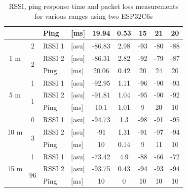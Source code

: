 \begin{table}[H]
\begin{tabular}{|c|c|l|l|c|c|c|c|c|}
        && Ping & [ms] & 19.94 & 0.53 & 15 & 21 & 20 \\\hline\hline
        \multirow{3}{*}{1 m} & \multirow{1}{*}{2} & RSSI 1 & [asu] & -86.83 & 2.98 & -93 & -80 & -88 \\\cline{2-9}\cline{2-9}
        & \multirow{2}{*}{2} & RSSI 2 & [asu] & -86.31 & 2.82 & -92 & -79 & -87 \\\cline{3-9}
        && Ping & [ms] & 20.06 & 0.42 & 20 & 24 & 20 \\\hline\hline
        \multirow{3}{*}{5 m} & \multirow{1}{*}{1} & RSSI 1 & [asu] & -92.95 & 1.11 & -96 & -90 & -93 \\\cline{2-9}\cline{2-9}
        & \multirow{2}{*}{1} & RSSI 2 & [asu] & -91.81 & 1.04 & -95 & -90 & -92 \\\cline{3-9}
        && Ping & [ms] & 10.1 & 1.01 & 9 & 20 & 10 \\\hline\hline
        \multirow{3}{*}{10 m} & \multirow{1}{*}{0} & RSSI 1 & [asu] & -94.73 & 1.3 & -98 & -91 & -95 \\\cline{2-9}\cline{2-9}
        & \multirow{2}{*}{3} & RSSI 2 & [asu] & -91 & 1.31 & -91 & -97 & -94 \\\cline{3-9}
        && Ping & [ms] & 10 & 0.14 & 9 & 11 & 10 \\\hline\hline
        \multirow{3}{*}{15 m} & \multirow{1}{*}{1} & RSSI 1 & [asu] & -73.42 & 4.9 & -88 & -66 & -72 \\\cline{2-9}\cline{2-9}
        & \multirow{2}{*}{96} & RSSI 2 & [asu] & -93.75 & 0.43 & -94 & -93 & -94 \\\cline{3-9}
        && Ping & [ms] & 10 & 0 & 10 & 10 & 10 \\\hline
    \end{tabular}
    \vspace{\ftspace}
    \caption{RSSI, ping response time and packet loss measurements for various ranges using two ESP32C6s}
    \label{tab:rssipingrange_esp32c6}
\end{table}


